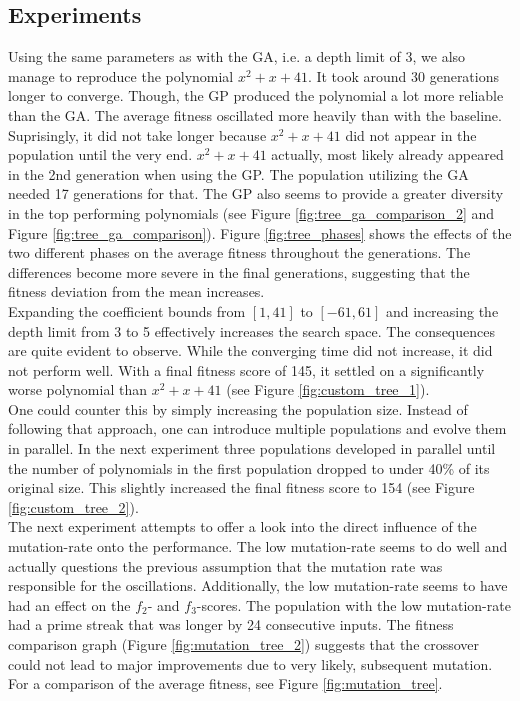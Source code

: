 \documentclass[11pt,a4paper]{article}
\begin{document}
\subsection*{Experiments}
Using the same parameters as with the GA, i.e. a depth limit of 3, we also manage to reproduce the polynomial $x^2+x+41$. It took around 30 generations longer to converge. Though, the GP produced the polynomial a lot more reliable than the GA. The average fitness oscillated more heavily than with the baseline. Suprisingly, it did not take longer because $x^2+x+41$ did not appear in the population until the very end. $x^2+x+41$ actually, most likely already appeared in the 2nd generation when using the GP. The population utilizing the GA needed 17 generations for that. The GP also seems to provide a greater diversity in the top performing polynomials (see Figure \ref{fig:tree_ga_comparison_2} and Figure \ref{fig:tree_ga_comparison}). Figure \ref{fig:tree_phases} shows the effects of the two different phases on the average fitness throughout the generations. The differences become more severe in the final generations, suggesting that the fitness deviation from the mean increases.\\
Expanding the coefficient bounds from $[1, 41]$ to $[-61, 61]$ and increasing the depth limit from 3 to 5 effectively increases the search space. The consequences are quite evident to observe. While the converging time did not increase, it did not perform well. With a final fitness score of 145, it settled on a significantly worse polynomial than $x^2+x+41$ (see Figure \ref{fig:custom_tree_1}). \\
One could counter this by simply increasing the population size. Instead of following that approach, one can introduce multiple populations and evolve them in parallel. In the next experiment three populations developed in parallel until the number of polynomials in the first population dropped to under 40\% of its original size. This slightly increased the final fitness score to 154 (see Figure \ref{fig:custom_tree_2}).
\\
The next experiment attempts to offer a look into the direct influence of the mutation-rate onto the performance. The low mutation-rate seems to do well and actually questions the previous assumption that the mutation rate was responsible for the oscillations. Additionally, the low mutation-rate seems to have had an effect on the $f_2$- and $f_3$-scores. The population with the low mutation-rate had a prime streak that was longer by 24 consecutive inputs. The fitness comparison graph (Figure \ref{fig:mutation_tree_2}) suggests that the crossover could not lead to major improvements due to very likely, subsequent mutation. For a comparison of the average fitness, see Figure \ref{fig:mutation_tree}. \\
\end{document}

